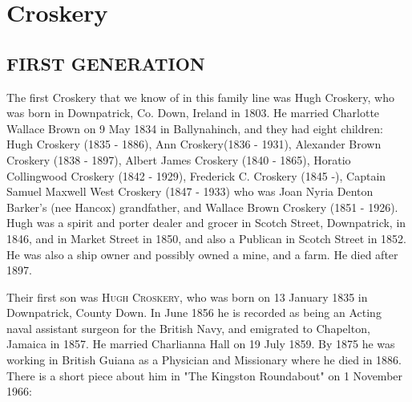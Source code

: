 \section{Croskery}

\subsection{FIRST GENERATION}

The first Croskery that we know of in this family line was Hugh Croskery, who was born in Downpatrick, Co. Down, Ireland in 1803.  He married Charlotte Wallace Brown on 9 May 1834 in Ballynahinch,  and they had eight children: Hugh Croskery (1835 - 1886), Ann Croskery(1836 - 1931), Alexander Brown Croskery (1838 - 1897), Albert James Croskery (1840 - 1865), Horatio Collingwood Croskery (1842 - 1929), Frederick C. Croskery (1845 -), Captain Samuel Maxwell West Croskery (1847 - 1933) who was Joan Nyria Denton Barker's (nee Hancox) grandfather, and Wallace Brown Croskery (1851 - 1926).
Hugh was a spirit and porter dealer and grocer in Scotch Street, Downpatrick, in 1846, and in Market Street in 1850, and also a Publican in Scotch Street in 1852. He was also a ship owner and possibly owned a mine, and a farm. He died after 1897.

Their first son was \textsc{Hugh Croskery},  who was born on 13 January 1835 in	Downpatrick, County Down. In June 1856 he is recorded as being an Acting naval assistant surgeon for the British Navy, and emigrated to Chapelton, Jamaica in 1857.  He married Charlianna Hall on	19 July 1859. By 1875 he was working in	British Guiana as a Physician and Missionary where he died in 1886. There is a short piece about him in "The Kingston Roundabout" on 1 November 1966:

